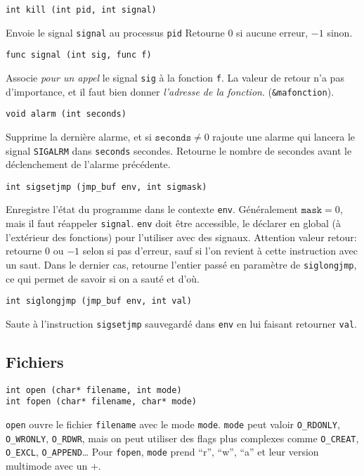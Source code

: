 \documentclass[9pt,a4paper,twocolumn]{article}
\begin{document}
    \begin{lstlisting}
int kill (int pid, int signal)
    \end{lstlisting}
    Envoie le signal \texttt{signal} au processus \texttt{pid}
    Retourne $0$ si aucune erreur, $-1$ sinon.

    \begin{lstlisting}
func signal (int sig, func f)
    \end{lstlisting}
    Associe \emph{pour un appel} le signal \texttt{sig} à la fonction \texttt{f}.
    La valeur de retour n'a pas d'importance, et il faut bien donner \emph{l'adresse de la fonction}.
    (\texttt{\&mafonction}).

    \begin{lstlisting}
void alarm (int seconds)
    \end{lstlisting}
    Supprime la dernière alarme, et si $\texttt{seconds} \neq 0$ rajoute une alarme qui lancera le signal \texttt{SIGALRM} dans \texttt{seconds} secondes.
    Retourne le nombre de secondes avant le déclenchement de l'alarme précédente.

    \begin{lstlisting}
int sigsetjmp (jmp_buf env, int sigmask)
    \end{lstlisting}
    Enregistre l'état du programme dans le contexte \texttt{env}. Généralement $\texttt{mask} = 0$, mais il faut réappeler \texttt{signal}.
    \texttt{env} doit être accessible, le déclarer en global (à l'extérieur des fonctions) pour l'utiliser avec des signaux.
    Attention valeur retour: retourne $0$ ou $-1$ selon si pas d'erreur, sauf si l'on revient à cette instruction avec un saut.
    Dans le dernier cas, retourne l'entier passé en paramètre de \texttt{siglongjmp}, ce qui permet de savoir si on a sauté et d'où.

    \begin{lstlisting}
int siglongjmp (jmp_buf env, int val)
    \end{lstlisting}
    Saute à l'instruction \texttt{sigsetjmp} sauvegardé dans \texttt{env} en lui faisant retourner \texttt{val}.

    \subsection{Fichiers}

    \begin{lstlisting}
int open (char* filename, int mode)
int fopen (char* filename, char* mode)
    \end{lstlisting}
    \texttt{open} ouvre le fichier \texttt{filename} avec le mode \texttt{mode}. \texttt{mode} peut valoir \texttt{O\_RDONLY}, \texttt{O\_WRONLY}, \texttt{O\_RDWR}, mais on peut utiliser des flags plus complexes comme \texttt{O\_CREAT}, \texttt{O\_EXCL}, \texttt{O\_APPEND}\ldots
    Pour \texttt{fopen}, \texttt{mode} prend ``r'', ``w'', ``a'' et leur version multimode avec un $+$.
\end{document}
